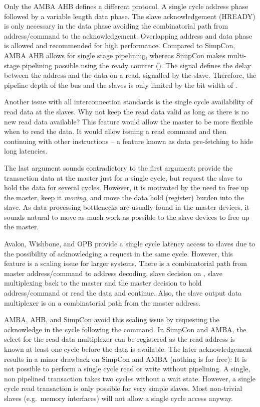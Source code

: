 Only the AMBA AHB \cite{soc:amba} defines a different protocol. A
single cycle address phase followed by a variable length data phase.
The slave acknowledgement (HREADY) is only necessary in the data
phase avoiding the combinatorial path from address/command to the
acknowledgement. Overlapping address and data phase is allowed and
recommended for high performance. Compared to SimpCon, AMBA AHB
allows for single stage pipelining, whereas SimpCon makes multi-stage
pipelining possible using the ready counter (). The
 signal defines the delay between the address and the
data on a read, signalled by the slave. Therefore, the pipeline depth
of the bus and the slaves is only limited by the bit width of
.


Another issue with all interconnection standards is the single cycle
availability of read data at the slaves. Why not keep the read data
valid as long as there is no new read data available? This feature
would allow the master to be more flexible when to read the data. It
would allow issuing a read command and then continuing with other
instructions -- a feature known as data pre-fetching to hide long
latencies.

The last argument sounds contradictory to the first argument: provide
the transaction data at the master just for a single cycle, but
request the slave to hold the data for several cycles. However, it is
motivated by the need to free up the master, keep it \emph{moving},
and move the data hold (register) burden into the slave. As data
processing bottlenecks are usually found in the master devices, it
sounds natural to move as much work as possible to the slave devices
to free up the master.

Avalon, Wishbone, and OPB provide a single cycle latency access to
slaves due to the possibility of acknowledging a request in the same
cycle. However, this feature is a scaling issue for larger systems.
There is a combinatorial path from master address/command to address
decoding, slave decision on , slave  multiplexing
back to the master and the master decision to hold address/command or
read the data and continue. Also, the slave output data multiplexer
is on a combinatorial path from the master address.

AMBA, AHB, and SimpCon avoid this scaling issue by requesting the
acknowledge in the cycle following the command. In SimpCon and AMBA,
the select for the read data multiplexer can be registered as the
read address is known at least one cycle before the data is
available. The later acknowledgement results in a minor drawback on
SimpCon and AMBA (nothing is for free): It is not possible to perform
a single cycle read or write without pipelining. A single, non
pipelined transaction takes two cycles without a wait state. However,
a single cycle read transaction is only possible for very simple
slaves. Most non-trivial slaves (e.g.\ memory interfaces) will not
allow a single cycle access anyway.

